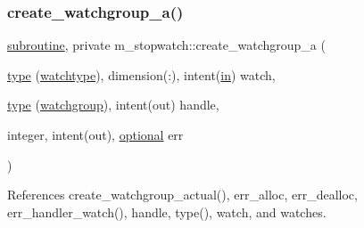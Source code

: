 \subsubsection{\texorpdfstring{create\+\_\+watchgroup\+\_\+a()}{create\_watchgroup\_a()}}
{\footnotesize\ttfamily \hyperlink{M__stopwatch_83_8txt_acfbcff50169d691ff02d4a123ed70482}{subroutine}, private m\+\_\+stopwatch\+::create\+\_\+watchgroup\+\_\+a (\begin{DoxyParamCaption}\item[{\hyperlink{stop__watch_83_8txt_a70f0ead91c32e25323c03265aa302c1c}{type} (\hyperlink{structm__stopwatch_1_1watchtype}{watchtype}), dimension(\+:), intent(\hyperlink{M__journal_83_8txt_afce72651d1eed785a2132bee863b2f38}{in})}]{watch,  }\item[{\hyperlink{stop__watch_83_8txt_a70f0ead91c32e25323c03265aa302c1c}{type} (\hyperlink{structm__stopwatch_1_1watchgroup}{watchgroup}), intent(out)}]{handle,  }\item[{integer, intent(out), \hyperlink{option__stopwatch_83_8txt_aa4ece75e7acf58a4843f70fe18c3ade5}{optional}}]{err }\end{DoxyParamCaption})\hspace{0.3cm}{\ttfamily [private]}}



References create\+\_\+watchgroup\+\_\+actual(), err\+\_\+alloc, err\+\_\+dealloc, err\+\_\+handler\+\_\+watch(), handle, type(), watch, and watches.

\mbox{\label{namespacem__stopwatch_abd31bbf07f8a1571c0ed46f9afc61667}} 
